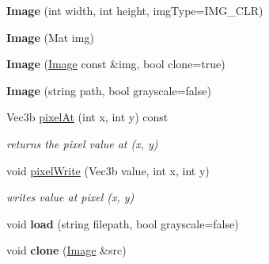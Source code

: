 \begin{DoxyCompactItemize}
\item 
\hypertarget{class_image_a0b993f2b506ec12654cb275921127b00}{{\bfseries Image} (int width, int height, img\-Type=I\-M\-G\-\_\-\-C\-L\-R)}\label{class_image_a0b993f2b506ec12654cb275921127b00}

\item 
\hypertarget{class_image_a583efff0899692314aa5a37fda3ec89e}{{\bfseries Image} (Mat img)}\label{class_image_a583efff0899692314aa5a37fda3ec89e}

\item 
\hypertarget{class_image_ae714fa5c88b1b87e647d7f839c7bb24f}{{\bfseries Image} (\hyperlink{class_image}{Image} const \&img, bool clone=true)}\label{class_image_ae714fa5c88b1b87e647d7f839c7bb24f}

\item 
\hypertarget{class_image_aab588538f35c49606ee9e7e51121d592}{{\bfseries Image} (string path, bool grayscale=false)}\label{class_image_aab588538f35c49606ee9e7e51121d592}

\item 
\hypertarget{class_image_a9b183ad498d8ffea3f91a21e5a67920d}{Vec3b \hyperlink{class_image_a9b183ad498d8ffea3f91a21e5a67920d}{pixel\-At} (int x, int y) const }\label{class_image_a9b183ad498d8ffea3f91a21e5a67920d}

\begin{DoxyCompactList}\small\item\em returns the pixel value at (x, y) \end{DoxyCompactList}\item 
\hypertarget{class_image_aec3c66b278ee2f0d0e12710627e97985}{void \hyperlink{class_image_aec3c66b278ee2f0d0e12710627e97985}{pixel\-Write} (Vec3b value, int x, int y)}\label{class_image_aec3c66b278ee2f0d0e12710627e97985}

\begin{DoxyCompactList}\small\item\em writes value at pixel (x, y) \end{DoxyCompactList}\item 
\hypertarget{class_image_a6750920d01caedc1a3782d9782df3cf1}{void {\bfseries load} (string filepath, bool grayscale=false)}\label{class_image_a6750920d01caedc1a3782d9782df3cf1}

\item 
\hypertarget{class_image_a2d48b9ae9b3e3bc254db7ee5b2cca0a4}{void {\bfseries clone} (\hyperlink{class_image}{Image} \&src)}\label{class_image_a2d48b9ae9b3e3bc254db7ee5b2cca0a4}


\end{DoxyCompactItemize}

